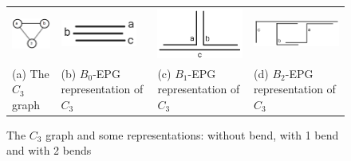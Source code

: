 \begin{figure}[h]
  \begin{tabular}{ p{2.5cm} p{2.6cm} p{3.7cm} p{2.5cm} }
     \includegraphics[width=2.3cm, left]{./img/trianguloabc.png} & \includegraphics[width=2.5cm]{./img/b0epgtriangulo.png} & \includegraphics[width=3.5cm, left]{./img/b1epgtriangulo.png} & 
  \includegraphics[width=5cm]{./img/b2epgtriangulo.png}\\%
    \footnotesize (a) The $C_3$ graph & \footnotesize(b) $B_0$-EPG representation of $C_3$  & \footnotesize \centering (c) $B_1$-EPG representation of $C_3$  &  \footnotesize  (d) $B_2$-EPG representation of $C_3$ \\
  \end{tabular}
 \caption{The $ C_3 $ graph  and some representations: without bend, with 1 bend and with 2 bends} \label{fig:trianguloepgRepresentacao}
\end{figure}
